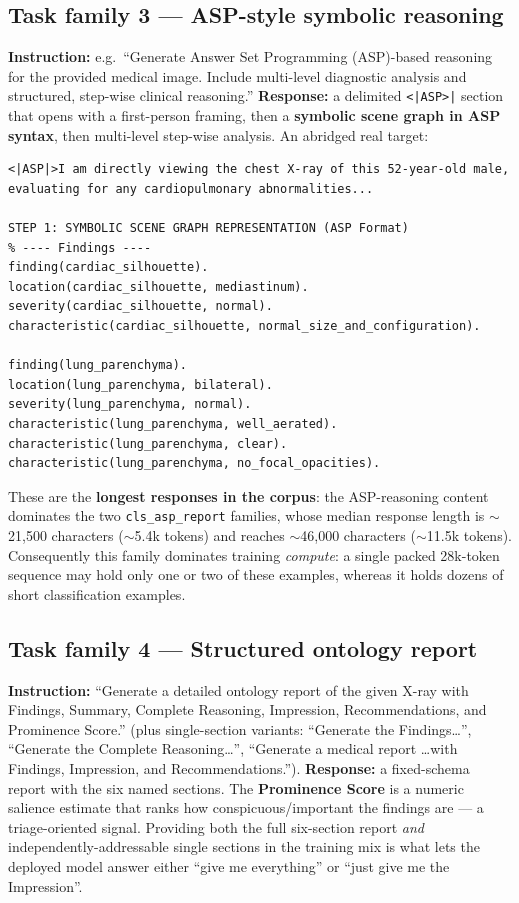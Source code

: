 \documentclass[11pt,a4paper]{article}
\begin{document}
\subsection{Task family 3 --- ASP-style symbolic reasoning}
\textbf{Instruction:} e.g.\ ``Generate Answer Set Programming (ASP)-based reasoning for the provided medical image. Include multi-level diagnostic analysis and structured, step-wise clinical reasoning.'' \textbf{Response:} a delimited \texttt{<|ASP>|} section that opens with a first-person framing, then a \textbf{symbolic scene graph in ASP syntax}, then multi-level step-wise analysis. An abridged real target:
\begin{lstlisting}
<|ASP|>I am directly viewing the chest X-ray of this 52-year-old male, evaluating for any cardiopulmonary abnormalities...

STEP 1: SYMBOLIC SCENE GRAPH REPRESENTATION (ASP Format)
% ---- Findings ----
finding(cardiac_silhouette).
location(cardiac_silhouette, mediastinum).
severity(cardiac_silhouette, normal).
characteristic(cardiac_silhouette, normal_size_and_configuration).

finding(lung_parenchyma).
location(lung_parenchyma, bilateral).
severity(lung_parenchyma, normal).
characteristic(lung_parenchyma, well_aerated).
characteristic(lung_parenchyma, clear).
characteristic(lung_parenchyma, no_focal_opacities).
\end{lstlisting}
These are the \textbf{longest responses in the corpus}: the ASP-reasoning content dominates the two \texttt{cls\_asp\_report} families, whose median response length is $\sim$21{,}500 characters ($\sim$5.4k tokens) and reaches $\sim$46{,}000 characters ($\sim$11.5k tokens). Consequently this family dominates training \emph{compute}: a single packed 28k-token sequence may hold only one or two of these examples, whereas it holds dozens of short classification examples.

\subsection{Task family 4 --- Structured ontology report}
\textbf{Instruction:} ``Generate a detailed ontology report of the given X-ray with Findings, Summary, Complete Reasoning, Impression, Recommendations, and Prominence Score.'' (plus single-section variants: ``Generate the Findings\dots'', ``Generate the Complete Reasoning\dots'', ``Generate a medical report \dots with Findings, Impression, and Recommendations.''). \textbf{Response:} a fixed-schema report with the six named sections. The \textbf{Prominence Score} is a numeric salience estimate that ranks how conspicuous/important the findings are --- a triage-oriented signal. Providing both the full six-section report \emph{and} independently-addressable single sections in the training mix is what lets the deployed model answer either ``give me everything'' or ``just give me the Impression''.
\end{document}
